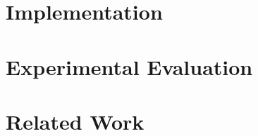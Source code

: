 \documentclass[sigconf,screen]{acmart}
\begin{document}






\section{Implementation}
\vspace*{\subsecspace}


\section{Experimental Evaluation}



\section{Related Work}








\begin{appendix}

\end{appendix}

\balance



%
\end{document}
